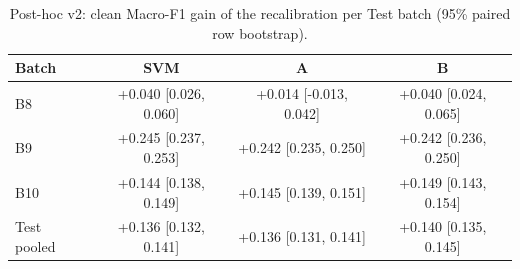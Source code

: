 \begin{table}[t]
\centering
\caption{Post-hoc v2: clean Macro-F1 gain of the recalibration per Test batch (95\% paired row bootstrap).}
\label{tab:v2gain}
\setlength{\tabcolsep}{4pt}
\begin{tabular}{lccc}
\toprule
Batch & SVM & A & B \\
\midrule
B8 & +0.040 [0.026, 0.060] & +0.014 [-0.013, 0.042] & +0.040 [0.024, 0.065] \\
B9 & +0.245 [0.237, 0.253] & +0.242 [0.235, 0.250] & +0.242 [0.236, 0.250] \\
B10 & +0.144 [0.138, 0.149] & +0.145 [0.139, 0.151] & +0.149 [0.143, 0.154] \\
Test pooled & +0.136 [0.132, 0.141] & +0.136 [0.131, 0.141] & +0.140 [0.135, 0.145] \\
\bottomrule
\end{tabular}
\end{table}
